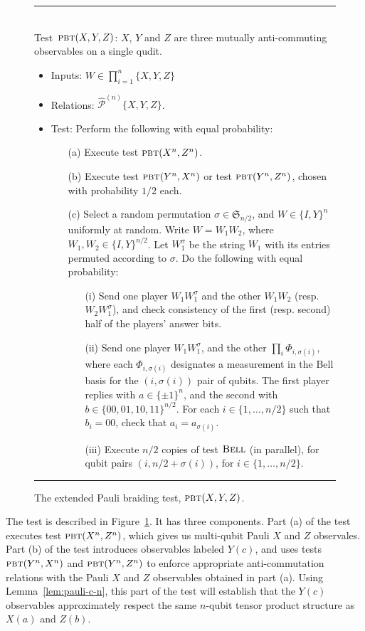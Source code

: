 \documentclass[11pt]{article}
\theoremstyle{remark}
\theoremstyle{definition}
\newcommand{\pbt}{\textsc{pbt}}
\newcommand{\bellt}{\textsc{Bell}}
\newcommand{\epaulin}{\hat{\mathcal{P}}^{(n)}\!}
\begin{document}
\begin{figure}[H]
\rule[1ex]{16.5cm}{0.5pt}\\
Test~$\pbt(X,Y,Z)$: $X$, $Y$ and $Z$ are three mutually anti-commuting observables on a single qudit. 
\begin{itemize}
\item Inputs: $W\in\prod_{i=1}^n\{X,Y,Z\}$
\item Relations: $\epaulin\{X,Y,Z\}$.  
\item Test: Perform the following with equal probability: 
\begin{enumerate}
\item[(a)] Execute test $\pbt(X^n,Z^n)$. 
\item[(b)] Execute test $\pbt(Y^n,X^n)$ or test $\pbt(Y^n,Z^n)$, chosen with probability $1/2$ each.
\item[(c)] Select a random permutation  $\sigma \in \mathfrak{S}_{n/2}$, and $W\in  \{I,Y\}^n$ uniformly at random. Write $W=W_1 W_2$, where $W_1,W_2\in \{I,Y\}^{n/2}$. Let $W_1^\sigma$ be the string $W_1$ with its entries permuted according to $\sigma$. Do the following with equal probability: 
\begin{enumerate}
\item[(i)] Send one player $W_1 W_1^\sigma$ and the other $W_1 W_2$ (resp. $W_2W_1^\sigma$), and check consistency of the first (resp. second) half of the players' answer bits.
\item[(ii)] Send one player $W_1  W_1^\sigma$, and the other $\prod_i \Phi_{i,\sigma(i)}$, where each $\Phi_{i,\sigma(i)}$ designates a measurement in the Bell basis for the $(i,\sigma(i))$ pair of qubits. 
    The first player replies with $a\in\{\pm 1 \}^n$, and the second with $b\in \{00,01,10,11\}^{n/2}$. For each
    $i\in\{1,\ldots,n/2\}$ such that $b_i = 00$, check that $a_i  = a_{\sigma(i)}$. 
\item[(iii)] Execute $n/2$ copies of test $\bellt$ (in parallel), for qubit pairs $(i,n/2+\sigma(i))$, for $i\in\{1,\ldots,n/2\}$. 
\end{enumerate}
\end{enumerate}
\end{itemize}
\rule[2ex]{16.5cm}{0.5pt}\vspace{-1cm}
\caption{The extended Pauli braiding test, $\pbt(X,Y,Z)$.}
\label{fig:e-pbt}
\end{figure}


The test is described in Figure~\ref{fig:e-pbt}. It has three components. Part (a) of the test executes test $\pbt(X^n,Z^n)$, which gives us multi-qubit Pauli $X$ and $Z$ observales. Part (b) of the test introduces observables labeled $Y(c)$, and uses tests $\pbt(Y^n,X^n)$ and $\pbt(Y^n,Z^n)$ to enforce appropriate anti-commutation relations with the Pauli $X$ and $Z$ observables obtained in part (a). Using Lemma~\ref{lem:pauli-c-n}, this part of the test will establish that the $Y(c)$ observables approximately respect the same $n$-qubit tensor product structure as $X(a)$ and $Z(b)$. 
\end{document}
